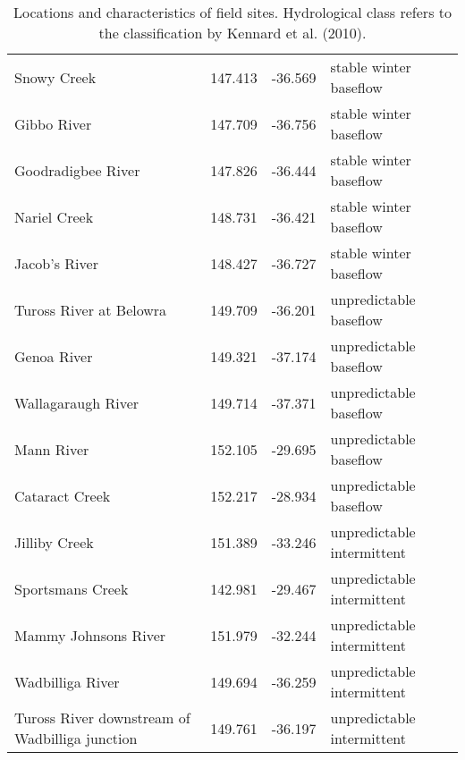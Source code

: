 \documentclass[openright,12pt,a4paper]{memoir}
\begin{document}
\onehalfspacing

\begin{table}[ht]
\tiny
\centering
\caption[Locations and characteristics of field sites.]{\small{Locations and characteristics of field sites. Hydrological class refers to the classification by Kennard et al. (2010).}}
\label{Ch2supp_T1}
{\tabulinesep=1.2mm
\begin{tabu}to 
\hline
{} &  &  &  \\
\hline
Snowy Creek & 147.413 & -36.569 & stable winter baseflow \\
Gibbo River & 147.709 & -36.756 & stable winter baseflow \\
Goodradigbee River & 147.826 & -36.444 & stable winter baseflow \\
Nariel Creek & 148.731 & -36.421 & stable winter baseflow \\
Jacob’s River & 148.427 & -36.727 & stable winter baseflow \\
Tuross River at Belowra & 149.709 & -36.201 & unpredictable baseflow \\
Genoa River & 149.321 & -37.174 & unpredictable baseflow \\
Wallagaraugh River & 149.714 & -37.371 & unpredictable baseflow \\
Mann River & 152.105 & -29.695 & unpredictable baseflow \\
Cataract Creek & 152.217 & -28.934 & unpredictable baseflow \\
Jilliby Creek & 151.389 & -33.246 & unpredictable intermittent \\
Sportsmans Creek & 142.981 & -29.467 & unpredictable intermittent \\
Mammy Johnsons River & 151.979 & -32.244 & unpredictable intermittent \\
Wadbilliga River & 149.694 & -36.259 & unpredictable intermittent \\
Tuross River downstream of Wadbilliga junction & 149.761 & -36.197 & unpredictable intermittent \\ \hline
\end{tabu}}
\end{table}
\clearpage
\end{document}
